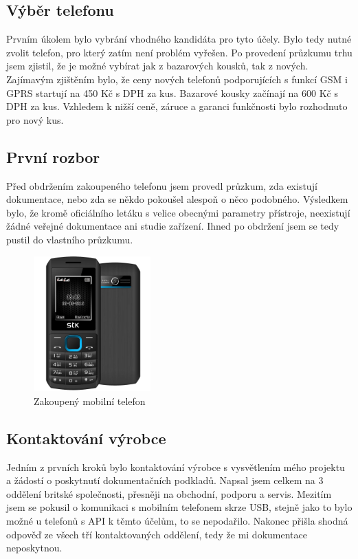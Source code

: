 \documentclass[FM,DP]{tulthesis}  %
\begin{document}
\subsection{Výběr telefonu}
Prvním úkolem bylo vybrání vhodného kandidáta pro tyto účely. Bylo tedy nutné zvolit telefon, pro který zatím není problém vyřešen. Po provedení průzkumu trhu jsem zjistil, že je možné vybírat jak z bazarových kousků, tak z nových. Zajímavým zjištěním bylo, že ceny nových telefonů podporujících s funkcí GSM i GPRS startují na 450 Kč s DPH za kus. Bazarové kousky začínají na 600 Kč s DPH za kus. Vzhledem k nižší ceně, záruce a garanci funkčnosti bylo rozhodnuto pro nový kus.

\subsection{První rozbor}
Před obdržením zakoupeného telefonu jsem provedl průzkum, zda existují dokumentace, nebo zda se někdo pokoušel alespoň o něco podobného. Výsledkem bylo, že kromě oficiálního letáku s velice obecnými parametry přístroje, neexistují žádné veřejné dokumentace ani studie zařízení. Ihned po obdržení jsem se tedy pustil do vlastního průzkumu.

\begin{figure}[H]
\begin{center}
\includegraphics[width=0.4\textwidth]{images/phone.png}
\caption{Zakoupený mobilní telefon}
\label{image}
\end{center}
\end{figure}

\subsection{Kontaktování výrobce}
Jedním z prvních kroků bylo kontaktování výrobce s vysvětlením mého projektu a žádostí o poskytnutí dokumentačních podkladů. Napsal jsem celkem na 3 oddělení britské společnosti, přesněji na obchodní, podporu a servis. Mezitím jsem se pokusil o komunikaci s mobilním telefonem skrze USB, stejně jako to bylo možné u telefonů s API k těmto účelům, to se nepodařilo. Nakonec přišla shodná odpověď ze všech tří kontaktovaných oddělení, tedy že mi dokumentace neposkytnou.
\end{document}
